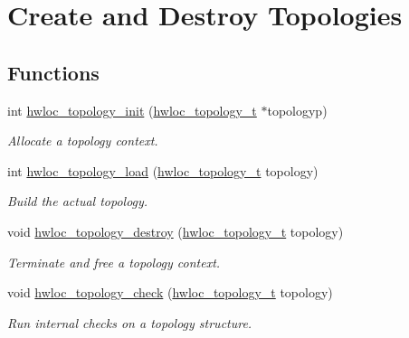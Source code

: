 \hypertarget{group__hwlocality__creation}{
\section{Create and Destroy Topologies}
\label{group__hwlocality__creation}
}
\subsection*{Functions}
\begin{CompactItemize}
\item 
int \hyperlink{group__hwlocality__creation_g03fd4a16d8b9ee1ffc32b25fd2f6bdfa}{hwloc\_\-topology\_\-init} (\hyperlink{group__hwlocality__topology_g9d1e76ee15a7dee158b786c30b6a6e38}{hwloc\_\-topology\_\-t} $\ast$topologyp)
\begin{CompactList}\small\item\em Allocate a topology context. \item\end{CompactList}\item 
int \hyperlink{group__hwlocality__creation_gbdf58d87ad77f6615fccdfe0535ff826}{hwloc\_\-topology\_\-load} (\hyperlink{group__hwlocality__topology_g9d1e76ee15a7dee158b786c30b6a6e38}{hwloc\_\-topology\_\-t} topology)
\begin{CompactList}\small\item\em Build the actual topology. \item\end{CompactList}\item 
void \hyperlink{group__hwlocality__creation_g9f34a640b6fd28d23699d4d084667b15}{hwloc\_\-topology\_\-destroy} (\hyperlink{group__hwlocality__topology_g9d1e76ee15a7dee158b786c30b6a6e38}{hwloc\_\-topology\_\-t} topology)
\begin{CompactList}\small\item\em Terminate and free a topology context. \item\end{CompactList}\item 
void \hyperlink{group__hwlocality__creation_gf6746bc3a558ef1ac8348b4491d091b5}{hwloc\_\-topology\_\-check} (\hyperlink{group__hwlocality__topology_g9d1e76ee15a7dee158b786c30b6a6e38}{hwloc\_\-topology\_\-t} topology)
\begin{CompactList}\small\item\em Run internal checks on a topology structure. \item\end{CompactList}\end{CompactItemize}


